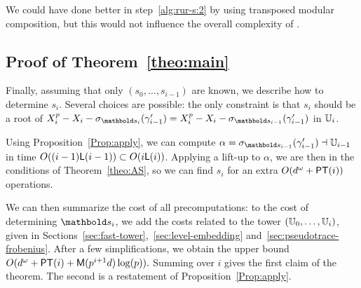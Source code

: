 \begin{nota}
  We could have done better in step~\ref{alg:rur-s:2} by using
  transposed modular composition, but this would not influence the
  overall complexity of \hyperref[alg:applyinverse]{}.
\end{nota}


\subsection[Proof of the theorem]{Proof of Theorem~\ref{theo:main}}

Finally, assuming that only $(s_0,\dots,s_{i-1})$ are known, we
describe how to determine $s_i$. Several choices are possible: the
only constraint is that $s_i$ should be a root of
$X_i^p-X_i-\sigma_{\lst{s}_i}(\gamma'_{i-1})=X_i^p-X_i-\sigma_{\lst{s}_{i-1}}(\gamma'_{i-1})$
in $\mathbb{U}_i$.

Using Proposition~\ref{Prop:apply}, we can compute
$\alpha=\sigma_{\lst{s}_{i-1}}(\gamma'_{i-1}) \wrt\U_{i-1}$ in time
$O((i-1)\mathsf{L}(i-1)) \subset O(i\mathsf{L}(i))$.  Applying a lift-up to $\alpha$,
we are then in the conditions of Theorem~\ref{theo:AS}, so we can find
$s_i$ for an extra $O(d^\omega + \mathsf{PT}(i))$ operations.

We can then summarize the cost of all precomputations: to the cost of
determining $\lst{s}_i$, we add the costs related to the tower
$(\mathbb{U}_0,\dots,\mathbb{U}_i)$, given in
Sections~\ref{sec:fast-tower},~\ref{sec:level-embedding}
and~\ref{sec:pseudotrace-frobenius}. After a few simplifications, we
obtain the upper bound $O( d^\omega + \mathsf{PT}(i) + \mathsf{M}(p^{i+1} d)
\log(p)).$ Summing over $i$ gives the first claim of the theorem. The
second is a restatement of Proposition~\ref{Prop:apply}.


%
